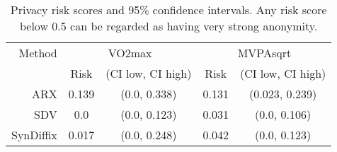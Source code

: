 \begin{table}
\begin{center}
\begin{small}
\begin{tabular}{rcccc}
\toprule
Method & \multicolumn{2}{c}{VO2max} & \multicolumn{2}{c}{MVPAsqrt} \\ 
 & Risk & (CI low, CI high) & Risk & (CI low, CI high) \\ 
\midrule
ARX & 0.139 & (0.0, 0.338) & 0.131 & (0.023, 0.239) & \\ 
SDV & 0.0 & (0.0, 0.123) & 0.031 & (0.0, 0.106) & \\ 
SynDiffix & 0.017 & (0.0, 0.248) & 0.042 & (0.0, 0.123) & \\ 
\bottomrule
\end{tabular}
\end{small}
\caption{Privacy risk scores and 95\% confidence intervals. Any risk score below 0.5 can be regarded as having very strong anonymity.}
\label{tab:risk_eval}
\end{center}
\end{table}
